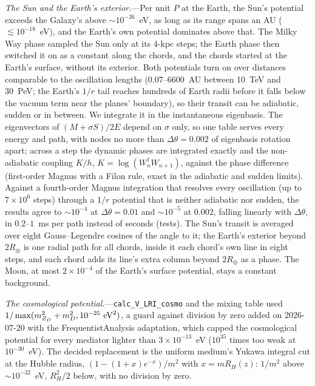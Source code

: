 \documentclass[11pt,a4paper]{article}
\newcommand{\mzd}{m_{Z_D}}
\begin{document}
\textit{The Sun and the Earth's exterior.}---Per unit $P$ at the Earth, the Sun's potential exceeds
the Galaxy's above $\sim10^{-26}$~eV, as long as its range spans an AU ($\lesssim10^{-18}$~eV), and the
Earth's own potential dominates above that. The Milky Way phase sampled the Sun only at its 4-kpc
steps; the Earth phase then switched it on as a constant along the chords, and the chords started
at the Earth's surface, without its exterior. Both potentials turn on over distances comparable to
the oscillation lengths ($0.07$--$6600$~AU between 10~TeV and 30~PeV; the Earth's $1/r$ tail reaches
hundreds of Earth radii before it falls below the vacuum term near the planes' boundary), so their
transit can be adiabatic, sudden or in between. We integrate it in the instantaneous eigenbasis. The
eigenvectors of $(M + \sigma S)/2E$ depend on $\sigma$ only, so one table serves every energy and
path, with nodes no more than $\Delta\theta = 0.002$ of eigenbasis rotation apart; across a step the
dynamic phases are integrated exactly and the non-adiabatic coupling $K/h$, $K = \log(W_n^\dagger
W_{n+1})$, against the phase difference (first-order Magnus with a Filon rule, exact in the adiabatic
and sudden limits). Against a fourth-order Magnus integration that resolves every oscillation (up to
$7\times10^6$ steps) through a $1/r$ potential that is neither adiabatic nor sudden, the results agree
to $\sim10^{-4}$ at $\Delta\theta = 0.01$ and $\sim10^{-5}$ at $0.002$, falling linearly with
$\Delta\theta$, in $0.2$--$1$~ms per path instead of seconds (tests). The Sun's transit is averaged
over eight Gauss--Legendre cosines of the angle to it; the Earth's exterior beyond $2R_\oplus$ is one
radial path for all chords, inside it each chord's own line in eight steps, and each chord adds its
line's extra column beyond $2R_\oplus$ as a phase. The Moon, at most $2\times10^{-4}$ of the Earth's
surface potential, stays a constant background.

\textit{The cosmological potential.}---\texttt{calc\_V\_LRI\_cosmo} and the mixing table used
$1/\max(\mzd^2 + m_D^2, 10^{-25}~{\rm eV}^2)$, a guard against division by zero added on
2026-07-20 with the FrequentistAnalysis adaptation, which capped the cosmological potential for
every mediator lighter than $3\times10^{-13}$~eV ($10^{35}$ times too weak at $10^{-30}$~eV). The
decided replacement is the uniform medium's Yukawa integral cut at the Hubble radius,
$(1 - (1 + x)e^{-x})/m^2$ with $x = mR_H(z)$: $1/m^2$ above $\sim10^{-32}$~eV, $R_H^2/2$ below, with no
division by zero.
\end{document}
